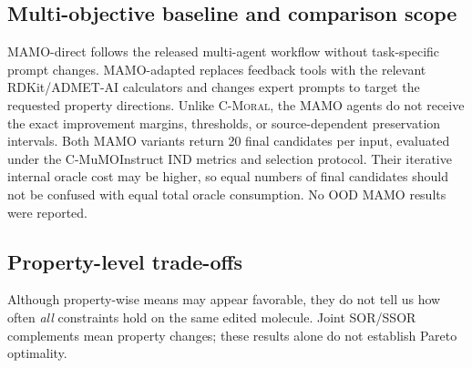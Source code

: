 \subsection{Multi-objective baseline and comparison scope}
\label{appendix:mamo}
MAMO-direct follows the released multi-agent workflow without task-specific prompt changes. MAMO-adapted replaces feedback tools with the relevant RDKit/ADMET-AI calculators and changes expert prompts to target the requested property directions. Unlike \textsc{C-Moral}, the MAMO agents do not receive the exact improvement margins, thresholds, or source-dependent preservation intervals. Both MAMO variants return 20 final candidates per input, evaluated under the C-MuMOInstruct IND metrics and selection protocol. Their iterative internal oracle cost may be higher, so equal numbers of final candidates should not be confused with equal total oracle consumption. No OOD MAMO results were reported.

\subsection{Property-level trade-offs}
\begin{table}[t]
\centering\small
\caption{BPQ means and joint constraint success, from the rebuttal.}
\label{tab:bpq_tradeoffs}
\end{table}
Although property-wise means may appear favorable, they do not tell us how often \emph{all} constraints hold on the same edited molecule. Joint SOR/SSOR complements mean property changes; these results alone do not establish Pareto optimality.

